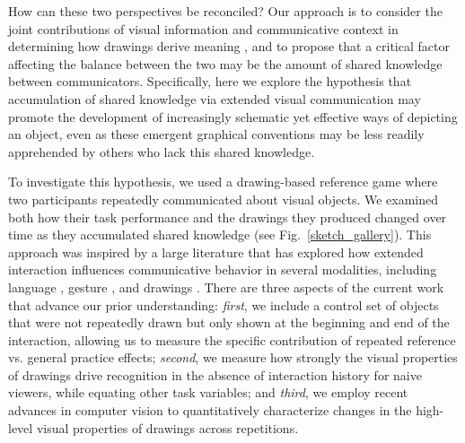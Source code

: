 \documentclass[11pt,letterpaper]{article}
\begin{document}
How can these two perspectives be reconciled?
Our approach is to consider the joint contributions of visual information and communicative context in determining how drawings derive meaning \cite{abell2009canny}, and to propose that a critical factor affecting the balance between the two may be the amount of shared knowledge between communicators.
Specifically, here we explore the hypothesis that accumulation of shared knowledge via extended visual communication may promote the development of increasingly schematic yet effective ways of depicting an object, even as these emergent graphical conventions may be less readily apprehended by others who lack this shared knowledge.

To investigate this hypothesis, we used a drawing-based reference game where two participants repeatedly communicated about visual objects.
We examined both how their task performance and the drawings they produced changed over time as they accumulated shared knowledge (see Fig.~\ref{sketch_gallery}).
This approach was inspired by a large literature that has explored how extended interaction influences communicative behavior in several modalities, including language \cite{ClarkWilkesGibbs86_ReferringCollaborative,hawkins2020characterizing}, gesture \cite{goldin1996silence}, and drawings \cite{garrod_foundations_2007,galantucci2005experimental}.
There are three aspects of the current work that advance our prior understanding: \emph{first}, we include a control set of objects that were not repeatedly drawn but only shown at the beginning and end of the interaction, allowing us to measure the specific contribution of repeated reference vs. general practice effects; \emph{second}, we measure how strongly the visual properties of drawings drive recognition in the absence of interaction history for naive viewers, while equating other task variables; and \emph{third}, we employ recent advances in computer vision to quantitatively characterize changes in the high-level visual properties of drawings across repetitions.



\end{document}
